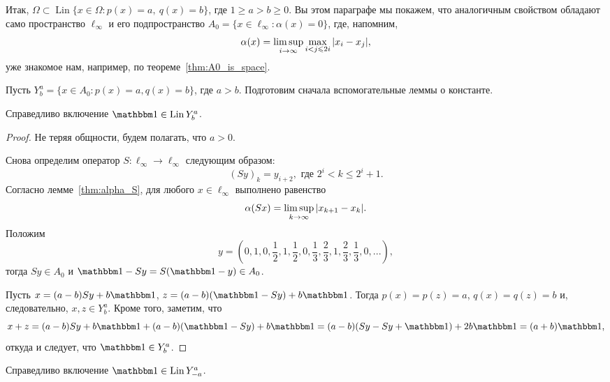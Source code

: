 Итак, $\Omega \subset \operatorname{Lin}\{x\in\Omega : p(x) = a,~ q(x) = b\}$, где $1\geq a>b\geq 0$.
Вы этом параграфе мы покажем, что аналогичным свойством обладают само пространство $\ell_\infty$
и его подпространство
$A_0 = \{ x \in \ell_\infty : \alpha(x) =0 \}$,
где, напомним,
\begin{equation*}
	\alpha(x) = \varlimsup_{i\to\infty} \max_{i<j\leqslant 2i} |x_i - x_j|
	,
\end{equation*}
уже знакомое нам, например, по теореме~\ref{thm:A0_is_space}.


Пусть $Y^a_b = \{x\in A_0 : p(x) = a, q(x) = b\}$, где $a>b$.
Подготовим сначала вспомогательные леммы о константе.

\begin{lemma}
	\label{lem:const_Lin_alpha_0}
	Справедливо включение
	$\one\in \operatorname{Lin} Y^a_b$.
\end{lemma}

\begin{proof}
	Не теряя общности, будем полагать, что $a>0$.

	Снова определим оператор $S:\ell_\infty \to \ell_\infty$ следующим образом:
	\begin{equation}\label{operator_S}
		(Sy)_k = y_{i+2}, \mbox{ где } 2^i < k \leq 2^i+1
		.
	\end{equation}
	Согласно лемме~\ref{thm:alpha_S},
	для любого $x\in \ell_\infty$ выполнено равенство
	\begin{equation}\label{alpha_S}
		\alpha(Sx) = \varlimsup_{k\to\infty} |x_{k+1} - x_{k}|
		.
	\end{equation}
	Положим
	\begin{equation}
		\label{eq:y_for_s_alpha}
		y = \left(0,1,0,\frac{1}{2},1,\frac{1}{2},0,\frac{1}{3},\frac{2}{3},1,\frac{2}{3},\frac{1}{3},0,...\right)
		,
	\end{equation}
	тогда $Sy\in A_0$ и $\one-Sy = S(\one-y)\in A_0$.

	Пусть $x=(a-b)Sy+b\one$, $z=(a-b)(\one-Sy)+b\one$.
	Тогда $p(x)=p(z)=a$, $q(x)=q(z)=b$ и, следовательно, $x,z\in Y^a_b$.
	Кроме того, заметим, что
	\begin{equation}
		x+z = (a-b)Sy+b\one + (a-b)(\one-Sy)+b\one
		=
		(a-b)(Sy-Sy+\one) + 2 b\one = (a+b)\one
		,
	\end{equation}
	откуда и следует, что $\one\in Y^a_b$.
\end{proof}


\begin{lemma}
	\label{lem:const_Lin_alpha_0_a_eq_-b}
	Справедливо включение
	$\one\in \operatorname{Lin} Y^a_{-a}$.
\end{lemma}

